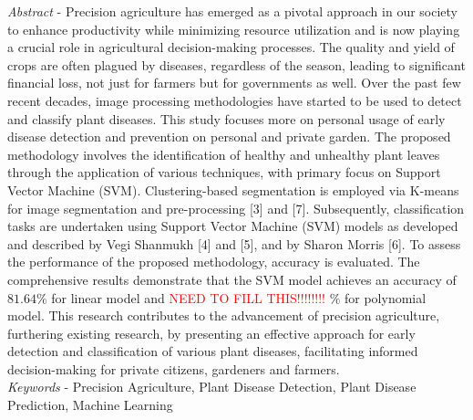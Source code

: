 \documentclass[twocolumn,10pt]{article}
\begin{document}
\begin{multicols}{2}
\begin{flushleft}
\justifying

\textit{Abstract} - Precision agriculture has emerged as a pivotal approach in our society to enhance productivity while minimizing resource utilization and is now playing a crucial role in agricultural decision-making processes. The quality and yield of crops are often plagued by diseases, regardless of the season, leading to significant financial loss, not just for farmers but for governments as well. Over the past few recent decades, image processing methodologies have started to be used to detect and classify plant diseases. This study focuses more on personal usage of early disease detection and prevention on personal and private garden. The proposed methodology involves the identification of healthy and unhealthy plant leaves through the application of various techniques, with primary focus on Support Vector Machine (SVM). Clustering-based segmentation is employed via K-means for image segmentation and pre-processing [3] and [7]. Subsequently, classification tasks are undertaken using Support Vector Machine (SVM) models as developed and described by Vegi Shanmukh [4] and [5], and by Sharon Morris [6]. To assess the performance of the proposed methodology, accuracy is evaluated. The comprehensive results demonstrate that the SVM model achieves an accuracy of $81.64\%$ for linear model and \textcolor{red}{NEED TO FILL THIS!!!!!!!!} $\%$ for polynomial model. This research contributes to the advancement of precision agriculture, furthering existing research, by presenting an effective approach for early detection and classification of various plant diseases, facilitating informed decision-making for private citizens, gardeners and farmers.\\
\textit{Keywords} - Precision Agriculture, Plant Disease Detection, Plant Disease Prediction, Machine Learning
	

\end{flushleft}
\end{multicols}
\end{document}

